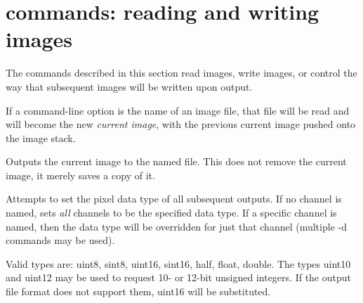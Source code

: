 \begin{comment}
\apiitem{--inplace}
Causes the output to \emph{replace} the input file, rather than create a
new file with a different name.

Without this flag, \oiiotool expects two file names, which will
be used to specify the input and output files, respectively.

But when {\cf --inplace} option is used, any number of file names $\ge 1$ may
be specified, and the image conversion commands are applied to each file
in turn, with the output being saved under the original file name.  This
is useful for applying the same conversion to many files.  

For example, the following example will add the caption ``Hawaii
vacation'' to all JPEG files in the current directory:

\begin{code}
        oiiotool --inplace --adjust-time --caption "Hawaii vacation" *.jpg
\end{code}
\apiend
\end{comment}


\section{\oiiotool commands: reading and writing images}

The commands described in this section read images, write images,
or control the way that subsequent images will be written upon output.

If a command-line option is the name of an image file, that file will
be read and will become the new \emph{current image}, with the previous
current image pushed onto the image stack.
\apiend

Outputs the current image to the named file.  This does not remove the
current image, it merely saves a copy of it.
\apiend


Attempts to set the pixel data type of all subsequent outputs.  If no
channel is named, sets \emph{all} channels to be the specified data
type.  If a specific channel is named, then the data type will be
overridden for just that channel (multiple {\cf -d} commands may be
used).

Valid types are: {\cf uint8}, {\cf sint8}, 
{\cf uint16}, {\cf sint16}, {\cf  half}, {\cf float}, {\cf double}.
The types {\cf uint10} and {\cf uint12} may be used to request 10- or
12-bit unsigned integers.  If the output file format does not support
them, {\cf uint16} will be substituted.

